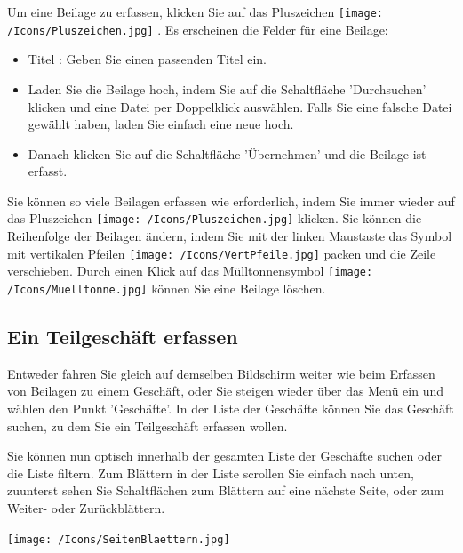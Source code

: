 \vspace{\baselineskip}

Um eine Beilage zu erfassen, klicken Sie auf das Pluszeichen \texttt{[image: /Icons/Pluszeichen.jpg]} . Es erscheinen die Felder für eine Beilage:

\begin{itemize}
\item
Titel : Geben Sie einen passenden Titel ein.
\item
Laden Sie die Beilage hoch, indem Sie auf die Schaltfläche 'Durchsuchen'  klicken und eine Datei per Doppelklick auswählen. Falls Sie
eine falsche Datei gewählt haben, laden Sie einfach eine neue hoch.
\item
Danach klicken Sie auf die Schaltfläche 'Übernehmen'  und die Beilage ist erfasst.
\end{itemize}


Sie können so viele Beilagen erfassen wie erforderlich, indem Sie immer wieder auf das Pluszeichen \texttt{[image: /Icons/Pluszeichen.jpg]}  klicken. Sie können die Reihenfolge der Beilagen ändern, indem Sie mit der linken Maustaste das Symbol mit vertikalen Pfeilen \texttt{[image: /Icons/VertPfeile.jpg]}  packen und die Zeile verschieben. Durch einen Klick auf das Mülltonnensymbol \texttt{[image: /Icons/Muelltonne.jpg]}  können Sie eine Beilage löschen.


\subsection{Ein Teilgeschäft erfassen}

Entweder fahren Sie gleich auf demselben Bildschirm weiter wie beim Erfassen von Beilagen zu einem Geschäft, oder Sie steigen wieder über das Menü ein und wählen den Punkt 'Geschäfte'. In der Liste der Geschäfte können Sie das Geschäft suchen, zu dem Sie ein Teilgeschäft erfassen wollen.

\vspace{\baselineskip}

Sie können nun optisch innerhalb der gesamten Liste der Geschäfte suchen oder die Liste filtern. Zum Blättern in der Liste scrollen Sie einfach nach unten, zuunterst sehen Sie Schaltflächen zum Blättern auf eine nächste Seite, oder zum Weiter- oder Zurückblättern.

\begin{center}
\texttt{[image: /Icons/SeitenBlaettern.jpg]}
\end{center}

